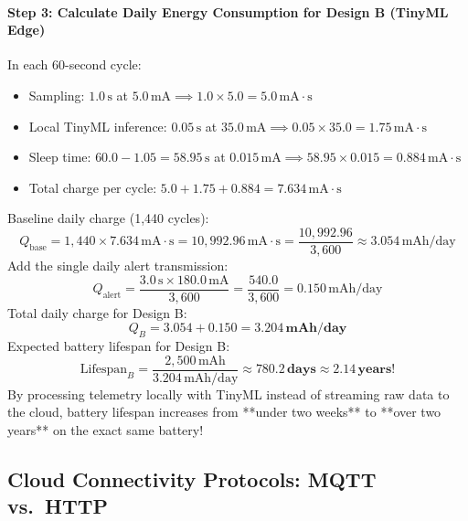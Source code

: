 \begin{example}
\paragraph{Step 3: Calculate Daily Energy Consumption for Design B (TinyML Edge)}
In each 60-second cycle:
\begin{itemize}
    \item Sampling: $1.0\,\text{s}$ at $5.0\,\text{mA} \implies 1.0 \times 5.0 = 5.0\,\text{mA}\cdot\text{s}$
    \item Local TinyML inference: $0.05\,\text{s}$ at $35.0\,\text{mA} \implies 0.05 \times 35.0 = 1.75\,\text{mA}\cdot\text{s}$
    \item Sleep time: $60.0 - 1.05 = 58.95\,\text{s}$ at $0.015\,\text{mA} \implies 58.95 \times 0.015 = 0.884\,\text{mA}\cdot\text{s}$
    \item Total charge per cycle: $5.0 + 1.75 + 0.884 = 7.634\,\text{mA}\cdot\text{s}$
\end{itemize}
Baseline daily charge (1,440 cycles):
\begin{equation*}
Q_{\text{base}} = 1{,}440 \times 7.634\,\text{mA}\cdot\text{s} = 10{,}992.96\,\text{mA}\cdot\text{s} = \frac{10{,}992.96}{3{,}600} \approx 3.054\,\text{mAh/day}
\end{equation*}
Add the single daily alert transmission:
\begin{equation*}
Q_{\text{alert}} = \frac{3.0\,\text{s} \times 180.0\,\text{mA}}{3{,}600} = \frac{540.0}{3{,}600} = 0.150\,\text{mAh/day}
\end{equation*}
Total daily charge for Design B:
\begin{equation*}
Q_B = 3.054 + 0.150 = \mathbf{3.204\,\text{mAh/day}}
\end{equation*}
Expected battery lifespan for Design B:
\begin{equation*}
\text{Lifespan}_B = \frac{2{,}500\,\text{mAh}}{3.204\,\text{mAh/day}} \approx \mathbf{780.2\,\text{days}} \approx \mathbf{2.14\,\text{years!}}
\end{equation*}
By processing telemetry locally with TinyML instead of streaming raw data to the cloud, battery lifespan increases from **under two weeks** to **over two years** on the exact same battery!
\end{example}

\subsection{Cloud Connectivity Protocols: MQTT vs.\ HTTP}\label{subsec:protocols}

